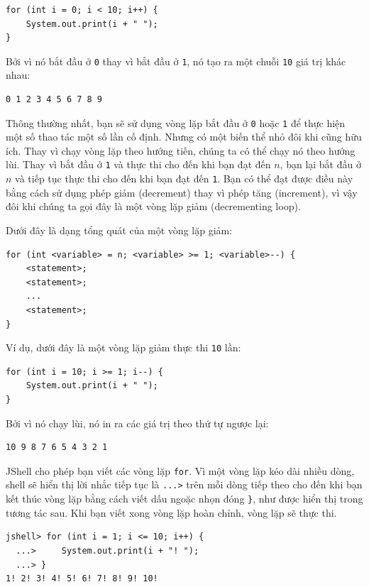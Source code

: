 \begin{verbatim}
for (int i = 0; i < 10; i++) {
    System.out.print(i + " ");
}
\end{verbatim}

Bởi vì nó bắt đầu ở \texttt{0} thay vì bắt đầu ở \texttt{1}, nó tạo ra
một chuỗi \texttt{10} giá trị khác nhau:

\begin{verbatim}
0 1 2 3 4 5 6 7 8 9
\end{verbatim}

Thông thường nhất, bạn sẽ sử dụng vòng lặp bắt đầu ở \texttt{0} hoặc
\texttt{1} để thực hiện một số thao tác một số lần cố định. Nhưng có một
biến thể nhỏ đôi khi cũng hữu ích. Thay vì chạy vòng lặp theo hướng
tiến, chúng ta có thể chạy nó theo hướng lùi. Thay vì bắt đầu ở
\texttt{1} và thực thi cho đến khi bạn đạt đến \(n\), bạn lại bắt đầu ở
\(n\) và tiếp tục thực thi cho đến khi bạn đạt đến \texttt{1}. Bạn có
thể đạt được điều này bằng cách sử dụng phép giảm (decrement) thay vì
phép tăng (increment), vì vậy đôi khi chúng ta gọi đây là một vòng lặp
giảm (decrementing loop).

Dưới đây là dạng tổng quát của một vòng lặp giảm:

\begin{verbatim}
for (int <variable> = n; <variable> >= 1; <variable>--) {
    <statement>;
    <statement>;
    ...
    <statement>;
}
\end{verbatim}

Ví dụ, dưới đây là một vòng lặp giảm thực thi \texttt{10} lần:

\begin{verbatim}
for (int i = 10; i >= 1; i--) {
    System.out.print(i + " ");
}
\end{verbatim}

Bởi vì nó chạy lùi, nó in ra các giá trị theo thứ tự ngược lại:

\begin{verbatim}
10 9 8 7 6 5 4 3 2 1
\end{verbatim}

JShell cho phép bạn viết các vòng lặp \texttt{for}. Vì một vòng lặp kéo
dài nhiều dòng, shell sẽ hiển thị lời nhắc tiếp tục là
\texttt{...\textgreater{}} trên mỗi dòng tiếp theo cho đến khi bạn kết
thúc vòng lặp bằng cách viết dấu ngoặc nhọn đóng \texttt{\}}, như được
hiển thị trong tương tác sau. Khi bạn viết xong vòng lặp hoàn chỉnh,
vòng lặp sẽ thực thi.

\begin{verbatim}
jshell> for (int i = 1; i <= 10; i++) {
  ...>     System.out.print(i + "! ");
  ...> } 
1! 2! 3! 4! 5! 6! 7! 8! 9! 10!
\end{verbatim}


